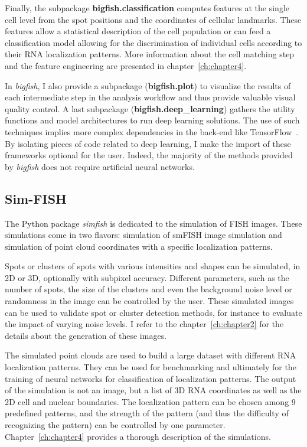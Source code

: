 Finally, the subpackage \textbf{bigfish.classification} computes features at the single cell level from the spot positions and the coordinates of cellular landmarks.
These features allow a statistical description of the cell population or can feed a classification model allowing for the discrimination of individual cells according to their RNA localization patterns.
More information about the cell matching step and the feature engineering are presented in chapter~\ref{ch:chapter4}.

In \emph{bigfish}, I also provide a subpackage (\textbf{bigfish.plot}) to visualize the results of each intermediate step in the analysis workflow and thus provide valuable visual quality control.
A last subpackage (\textbf{bigfish.deep\_learning}) gathers the utility functions and model architectures to run deep learning solutions.
The use of such techniques implies more complex dependencies in the back-end like TensorFlow~\cite{tensorflow_2015}.
By isolating pieces of code related to deep learning, I make the import of these frameworks optional for the user.
Indeed, the majority of the methods provided by \emph{bigfish} does not require artificial neural networks.

\subsection{Sim-FISH}
\label{subsec:simfish}

The Python package \emph{simfish} is dedicated to the simulation of \ac{FISH} images.
These simulations come in two flavors: simulation of \ac{smFISH} image simulation and simulation of point cloud coordinates with a specific localization patterns.

Spots or clusters of spots with various intensities and shapes can be simulated, in 2D or 3D, optionally with subpixel accuracy.
Different parameters, such as the number of spots, the size of the clusters and even the background noise level or randomness in the image can be controlled by the user.
These simulated images can be used to validate spot or cluster detection methods, for instance to evaluate the impact of varying noise levels.
I refer to the chapter~\ref{ch:chapter2} for the details about the generation of these images.

The simulated point clouds are used to build a large dataset with different \ac{RNA} localization patterns.
They can be used for benchmarking and ultimately for the training of neural networks for classification of localization patterns.
The output of the simulation is not an image, but a list of 3D \ac{RNA} coordinates as well as the 2D cell and nuclear boundaries.
The localization pattern can be chosen among 9 predefined patterns, and the strength of the pattern (and thus the difficulty of recognizing the pattern) can be controlled by one parameter.
Chapter~\ref{ch:chapter4} provides a thorough description of the simulations.

